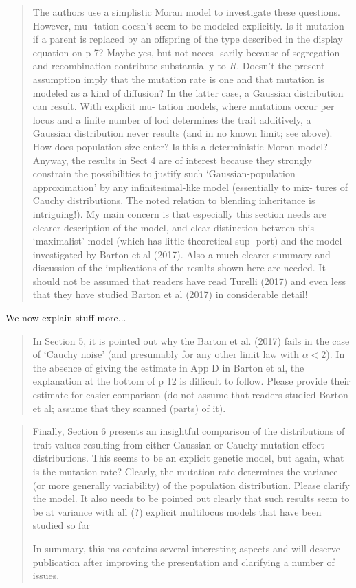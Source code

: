 \begin{quote}
The authors use a simplistic Moran model to investigate these questions. However, mu-
tation doesn’t seem to be modeled explicitly. Is it mutation if a parent is replaced by an
offspring of the type described in the display equation on p 7? Maybe yes, but not neces-
sarily because of segregation and recombination contribute substantially to $R$. Doesn’t the
present assumption imply that the mutation rate is one and that mutation is modeled as a
kind of diffusion? In the latter case, a Gaussian distribution can result. With explicit mu-
tation models, where mutations occur per locus and a finite number of loci determines the
trait additively, a Gaussian distribution never results (and in no known limit; see above).
How does population size enter? Is this a deterministic Moran model? Anyway, the results
in Sect 4 are of interest because they strongly constrain the possibilities to justify such
‘Gaussian-population approximation’ by any infinitesimal-like model (essentially to mix-
tures of Cauchy distributions. The noted relation to blending inheritance is intriguing!).
My main concern is that especially this section needs are clearer description of the model,
and clear distinction between this ‘maximalist’ model (which has little theoretical sup-
port) and the model investigated by Barton et al (2017). Also a much clearer summary
and discussion of the implications of the results shown here are needed. It should not be
assumed that readers have read Turelli (2017) and even less that they have studied Barton
et al (2017) in considerable detail!
\end{quote}

We now explain stuff more...

\begin{quote}
In Section 5, it is pointed out why the Barton et al. (2017) fails in the case of ‘Cauchy
noise’ (and presumably for any other limit law with $\alpha < 2$). In the absence of giving the
estimate in App D in Barton et al, the explanation at the bottom of p 12 is difficult to
follow. Please provide their estimate for easier comparison (do not assume that readers
studied Barton et al; assume that they scanned (parts) of it).
\end{quote}

\begin{quote}
Finally, Section 6 presents an insightful comparison of the distributions of trait values
resulting from either Gaussian or Cauchy mutation-effect distributions. This seems to be
an explicit genetic model, but again, what is the mutation rate? Clearly, the mutation
rate determines the variance (or more generally variability) of the population distribution.
Please clarify the model. It also needs to be pointed out clearly that such results seem to
be at variance with all (?) explicit multilocus models that have been studied so far

In summary, this ms contains several interesting aspects and will deserve publication after
improving the presentation and clarifying a number of issues.
\end{quote}


